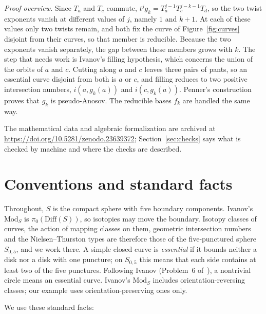 \documentclass[11pt]{article}
\theoremstyle{remark}
\newcommand{\Mod}{\mathrm{Mod}}
\begin{document}
\noindent\emph{Proof overview.} Since $T_a$ and $T_c$ commute,
$t^jg_k=T_a^{j-1}T_c^{j-k-1}T_d$, so the two twist exponents vanish at
different values of $j$, namely $1$ and $k+1$. At each of these values
only two twists remain, and both fix the curve of Figure~\ref{fig:curves}
disjoint from their curves, so that member is reducible. Because the two
exponents vanish separately, the gap between these members grows with $k$.
The step that needs work is Ivanov's filling hypothesis, which concerns
the union of the orbits of $a$ and $c$. Cutting along $a$ and $c$ leaves
three pairs of pants, so an essential curve disjoint from both is $a$ or
$c$, and filling reduces to two positive intersection numbers,
$i(a,g_k(a))$ and $i(c,g_k(a))$. Penner's
construction~\cite[Theorem~3.1]{Penner} proves that $g_k$ is
pseudo-Anosov. The reducible bases $f_k$ are handled the same way.

The mathematical data and algebraic formalization are archived at
\url{https://doi.org/10.5281/zenodo.23639372}; Section~\ref{sec:checks}
says what is checked by machine and where the checks are described.

\section{Conventions and standard facts}\label{sec:conventions}

Throughout, $S$ is the compact sphere with five boundary components.
Ivanov's $\Mod_S$ is $\pi_0(\mathrm{Diff}(S))$, so isotopies may move the
boundary. Isotopy classes of curves, the action of mapping classes on them,
geometric intersection numbers and the Nielsen--Thurston types are therefore
those of the five-punctured sphere $S_{0,5}$, and we work there. A simple
closed curve is \emph{essential} if it bounds neither a disk nor a disk with
one puncture; on $S_{0,5}$ this means that each side contains at least two
of the five punctures. Following Ivanov (Problem~6 of~\cite{Ivanov06}), a
nontrivial circle means an essential curve.
Ivanov's $\Mod_S$ includes orientation-reversing classes; our example uses
orientation-preserving ones only.

We use these standard facts:
\end{document}
